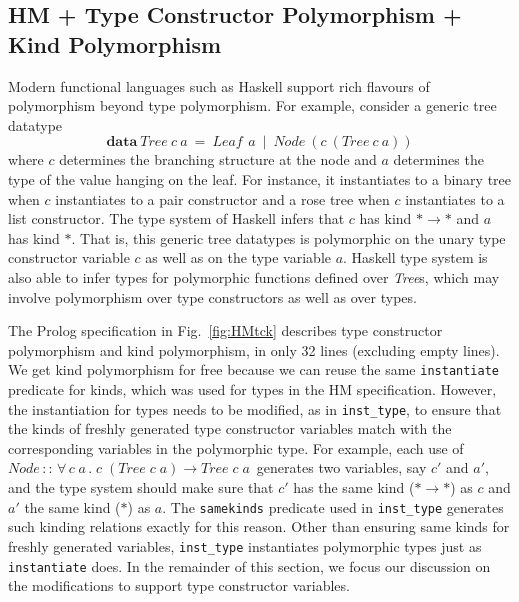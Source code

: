 \documentclass[runningheads,a4paper]{llncs}
\begin{document}
\subsection{HM + Type Constructor Polymorphism + Kind Polymorphism}
\label{ssec:HMtck}
Modern functional languages such as Haskell support rich flavours of
polymorphism beyond type polymorphism. For example, consider
a generic tree datatype
\[ \textbf{data}~\textit{Tree}~c~a
  ~=~ \textit{Leaf}\,~a ~\mid~ \textit{Node}~(c~(\textit{Tree}~c~a)) \]
where $c$ determines the branching structure at the node and $a$
determines the type of the value hanging on the leaf. For instance,
it instantiates to a binary tree when $c$ instantiates to a pair constructor
and a rose tree when $c$ instantiates to a list constructor.
The type system of Haskell infers that $c$ has kind $*\to*$ and
$a$ has kind $*$. That is, this generic tree datatypes is polymorphic on
the unary type constructor variable $c$ as well as on the type variable $a$.
Haskell type system is also able to infer types for polymorphic functions defined
over \textit{Tree}s, which may involve polymorphism over type constructors
as well as over types.

The Prolog specification in Fig.~\ref{fig:HMtck} describes
type constructor polymorphism and kind polymorphism, in only 32 lines
(excluding empty lines). We get kind polymorphism for free because
we can reuse the same \verb|instantiate| predicate for kinds, which was
used for types in the HM specification. However, the instantiation for
types needs to be modified, as in \verb|inst_type|, to ensure that
the kinds of freshly generated type constructor variables match with
the corresponding variables in the polymorphic type. For example, each use of
$\textit{Node}\,::\,
 \forall\,c\;a\,.\;c\;(\textit{Tree}\;c\;a)\to\textit{Tree}\;c\;a\,$
generates two variables, say $c'$ and $a'$, and the type system should make sure
that $c'$ has the same kind ($*\to*$) as $c$ and $a'$ the same kind ($*$) as $a$.
The \verb|samekinds| predicate used in \verb|inst_type| generates such
kinding relations exactly for this reason. Other than ensuring same kinds for
freshly generated variables, \verb|inst_type| instantiates polymorphic types
just as \verb|instantiate| does. In the remainder of this section, we focus
our discussion on the modifications to support type constructor variables.
\end{document}
